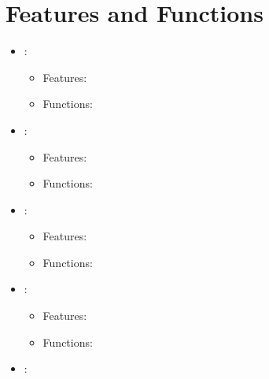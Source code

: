 \section{Features and Functions}
\begin{itemize}
  \item {}:
  \begin{itemize}
    \item Features:
    \item Functions:
  \end{itemize}
  \item {}:
  \begin{itemize}
    \item Features:
    \item Functions:
  \end{itemize}
  \item {}:
  \begin{itemize}
    \item Features:
    \item Functions:
  \end{itemize}
  \item {}:
  \begin{itemize}
    \item Features:
    \item Functions:
  \end{itemize}
  \item {}:
\end{itemize}